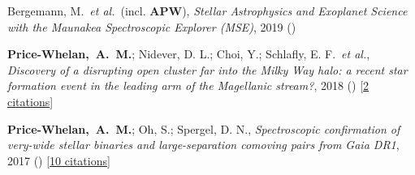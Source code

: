 \item[{\color{deemph}\scriptsize3}]Bergemann, M.~\textit{et al.}~(incl. \textbf{APW}), \textit{Stellar Astrophysics and Exoplanet Science with the Maunakea Spectroscopic Explorer (MSE)}, 2019 ()

\item[{\color{deemph}\scriptsize2}]\textbf{Price-Whelan,~A.~M.}; Nidever, D. L.; Choi, Y.; Schlafly, E. F.~\textit{et al.}, \textit{Discovery of a disrupting open cluster far into the Milky Way halo: a recent star formation event in the leading arm of the Magellanic stream?}, 2018 () [\href{http://adsabs.harvard.edu/abs/2018arXiv181105991P}{2 citations}]

\item[{\color{deemph}\scriptsize1}]\textbf{Price-Whelan,~A.~M.}; Oh, S.; Spergel, D. N., \textit{Spectroscopic confirmation of very-wide stellar binaries and large-separation comoving pairs from Gaia DR1}, 2017 () [\href{http://adsabs.harvard.edu/abs/2017arXiv170903532P}{10 citations}]